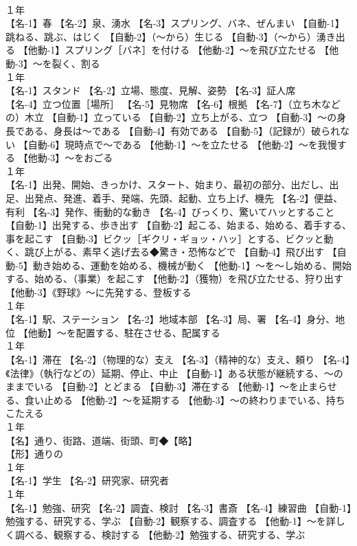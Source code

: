 \documentclass[8pt]{extreport}
\begin{document}
\begin{CJK}{UTF8}{min}
\\	１年	
\\	【名-1】春 【名-2】泉、湧水 【名-3】スプリング、バネ、ぜんまい 【自動-1】跳ねる、跳ぶ、はじく 【自動-2】（～から）生じる 【自動-3】（～から）湧き出る 【他動-1】スプリング［バネ］を付ける 【他動-2】～を飛び立たせる 【他動-3】～を裂く、割る
\\	１年	
\\	【名-1】スタンド 【名-2】立場、態度、見解、姿勢 【名-3】証人席
\\	【名-4】立つ位置［場所］ 【名-5】見物席 【名-6】根拠 【名-7】（立ち木などの）木立 【自動-1】立っている 【自動-2】立ち上がる、立つ 【自動-3】～の身長である、身長は～である 【自動-4】有効である 【自動-5】（記録が）破られない 【自動-6】現時点で～である 【他動-1】～を立たせる 【他動-2】～を我慢する 【他動-3】～をおごる
\\	１年	
\\	【名-1】出発、開始、きっかけ、スタート、始まり、最初の部分、出だし、出足、出発点、発進、着手、発端、先頭、起動、立ち上げ、機先 【名-2】便益、有利 【名-3】発作、衝動的な動き 【名-4】びっくり、驚いてハッとすること 【自動-1】出発する、歩き出す 【自動-2】起こる、始まる、始める、着手する、事を起こす 【自動-3】ビクッ［ギクリ・ギョッ・ハッ］とする、ビクッと動く、跳び上がる、素早く逃げ去る◆驚き・恐怖などで 【自動-4】飛び出す 【自動-5】動き始める、運動を始める、機械が動く 【他動-1】～を～し始める、開始する、始める、（事業）を起こす 【他動-2】（獲物）を飛び立たせる、狩り出す 【他動-3】《野球》～に先発する、登板する
\\	１年	
\\	【名-1】駅、ステーション 【名-2】地域本部 【名-3】局、署 【名-4】身分、地位 【他動】～を配置する、駐在させる、配属する
\\	１年	
\\	【名-1】滞在 【名-2】（物理的な）支え 【名-3】（精神的な）支え、頼り 【名-4】《法律》（執行などの）延期、停止、中止 【自動-1】ある状態が継続する、～のままでいる 【自動-2】とどまる 【自動-3】滞在する 【他動-1】～を止まらせる、食い止める 【他動-2】～を延期する 【他動-3】～の終わりまでいる、持ちこたえる
\\	１年	
\\	【名】通り、街路、道端、街頭、町◆【略】
\\	【形】通りの
\\	１年	
\\	【名-1】学生 【名-2】研究家、研究者
\\	１年	
\\	【名-1】勉強、研究 【名-2】調査、検討 【名-3】書斎 【名-4】練習曲 【自動-1】勉強する、研究する、学ぶ 【自動-2】観察する、調査する 【他動-1】～を詳しく調べる、観察する、検討する 【他動-2】勉強する、研究する、学ぶ

\end{CJK}
\end{document}
